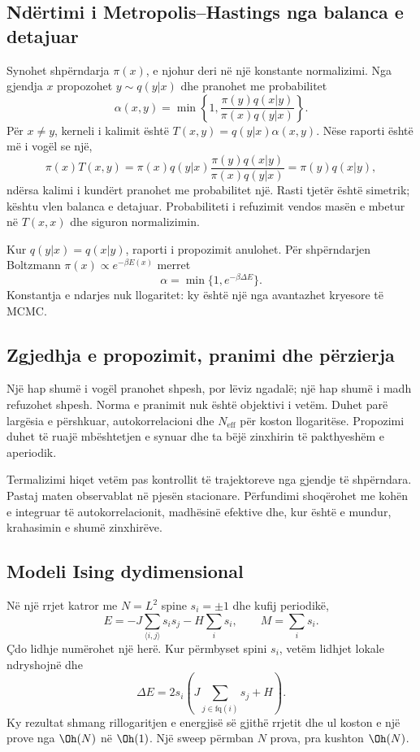 \subsection{Ndërtimi i Metropolis--Hastings nga balanca e detajuar}
Synohet shpërndarja $\pi(x)$, e njohur deri në një konstante normalizimi. Nga gjendja $x$ propozohet $y\sim q(y|x)$ dhe pranohet me probabilitet
\begin{equation}
 \alpha(x,y)=\min\left\{1,
 \frac{\pi(y)q(x|y)}{\pi(x)q(y|x)}\right\}.
\end{equation}
Për $x\ne y$, kerneli i kalimit është $T(x,y)=q(y|x)\alpha(x,y)$. Nëse raporti është më i vogël se një,
\begin{equation}
 \pi(x)T(x,y)=\pi(x)q(y|x)
 \frac{\pi(y)q(x|y)}{\pi(x)q(y|x)}
 =\pi(y)q(x|y),
\end{equation}
ndërsa kalimi i kundërt pranohet me probabilitet një. Rasti tjetër është simetrik; kështu vlen balanca e detajuar. Probabiliteti i refuzimit vendos masën e mbetur në $T(x,x)$ dhe siguron normalizimin.

Kur $q(y|x)=q(x|y)$, raporti i propozimit anulohet. Për shpërndarjen Boltzmann $\pi(x)\propto e^{-\beta E(x)}$ merret
\begin{equation}
 \alpha=\min\{1,e^{-\beta\Delta E}\}.
\end{equation}
Konstantja e ndarjes nuk llogaritet: ky është një nga avantazhet kryesore të MCMC.

\subsection{Zgjedhja e propozimit, pranimi dhe përzierja}
Një hap shumë i vogël pranohet shpesh, por lëviz ngadalë; një hap shumë i madh refuzohet shpesh. Norma e pranimit nuk është objektivi i vetëm. Duhet parë largësia e përshkuar, autokorrelacioni dhe $N_{\mathrm{eff}}$ për koston llogaritëse. Propozimi duhet të ruajë mbështetjen e synuar dhe ta bëjë zinxhirin të pakthyeshëm e aperiodik.

Termalizimi hiqet vetëm pas kontrollit të trajektoreve nga gjendje të shpërndara. Pastaj maten observablat në pjesën stacionare. Përfundimi shoqërohet me kohën e integruar të autokorrelacionit, madhësinë efektive dhe, kur është e mundur, krahasimin e shumë zinxhirëve.

\subsection{Modeli Ising dydimensional}
Në një rrjet katror me $N=L^2$ spine $s_i=\pm1$ dhe kufij periodikë,
\begin{equation}
 E=-J\sum_{\langle i,j\rangle}s_is_j-H\sum_i s_i,
 \qquad M=\sum_i s_i.
\end{equation}
Çdo lidhje numërohet një herë. Kur përmbyset spini $s_i$, vetëm lidhjet lokale ndryshojnë dhe
\begin{equation}
 \Delta E=2s_i\left(J\sum_{j\in\mathrm{fq}(i)}s_j+H\right).
\end{equation}
Ky rezultat shmang rillogaritjen e energjisë së gjithë rrjetit dhe ul koston e një prove nga $\Oh(N)$ në $\Oh(1)$. Një sweep përmban $N$ prova, pra kushton $\Oh(N)$.


